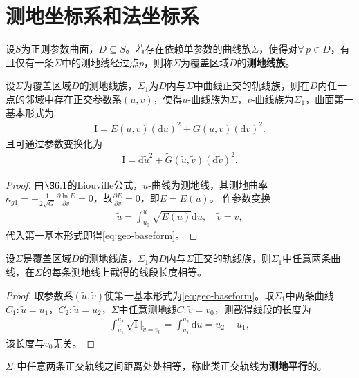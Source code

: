 \documentclass[../../main.tex]{subfiles}%
\begin{document}
\section{测地坐标系和法坐标系}

\begin{definition}
设$S$为正则参数曲面，$D\subseteq S$。若存在依赖单参数的曲线族$\Sigma$，使得对$\forall\,p\in D$，有且仅有一条$\Sigma$中的测地线经过点$p$，则称$\Sigma$为覆盖区域$D$的\textbf{测地线族}。
\end{definition}

\begin{proposition}
设$\Sigma$为覆盖区域$D$的测地线族，$\Sigma_1$为$D$内与$\Sigma$中曲线正交的轨线族，则在$D$内任一点的邻域中存在正交参数系$(u,v)$，使得$u$-曲线族为$\Sigma$，$v$-曲线族为$\Sigma_1$，曲面第一基本形式为
\begin{align*}
\mathrm{I}=E(u,v)(\mathrm{d}u)^2+G(u,v)(\mathrm{d}v)^2.
\end{align*}
且可通过参数变换化为
\begin{align}
\mathrm{I}=\mathrm{d}\tilde{u}^2+\tilde{G}(\tilde{u},\tilde{v})(\mathrm{d}\tilde{v})^2.\label{eq:geo-baseform}
\end{align}
\end{proposition}
\begin{proof}
由$\S6.1$的Liouville公式，$u$-曲线为测地线，其测地曲率$\kappa_{g1}=-\frac{1}{2\sqrt{G}}\frac{\partial\ln E}{\partial v}=0$，故$\frac{\partial E}{\partial v}=0$，即$E=E(u)$。
作参数变换
\begin{align*}
\tilde{u}=\int_{u_0}^u\sqrt{E(u)}\mathrm{d}u,\quad \tilde{v}=v,
\end{align*}
代入第一基本形式即得\eqref{eq:geo-baseform}。
\end{proof}

\begin{theorem}
设$\Sigma$是覆盖区域$D$的测地线族，$\Sigma_1$为$D$内与$\Sigma$正交的轨线族，则$\Sigma_1$中任意两条曲线，在$\Sigma$的每条测地线上截得的线段长度相等。
\end{theorem}
\begin{proof}
取参数系$(\tilde{u},\tilde{v})$使第一基本形式为\eqref{eq:geo-baseform}。取$\Sigma_1$中两条曲线$C_1:\tilde{u}=u_1$，$C_2:\tilde{u}=u_2$，$\Sigma$中任意测地线$C:\tilde{v}=v_0$，则截得线段的长度为
\begin{align*}
\int_{u_1}^{u_2}\sqrt{\mathrm{I}}\bigg|_{\tilde{v}=v_0}=\int_{u_1}^{u_2}\mathrm{d}\tilde{u}=u_2-u_1,
\end{align*}
该长度与$v_0$无关。
\end{proof}
\begin{remark}
$\Sigma_1$中任意两条正交轨线之间距离处处相等，称此类正交轨线为\textbf{测地平行}的。
\end{remark}
\end{document}
